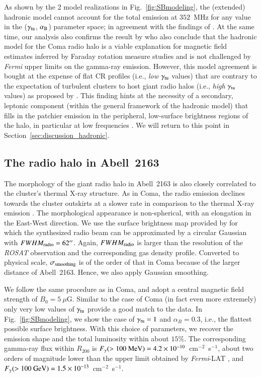 \documentclass[useAMS,usenatbib]{mn2e}
\begin{document}
As shown by the 2 model realizations in Fig.~\ref{fig:SBmodeling}, the
(extended) hadronic model cannot account for the total emission at $352$~MHz for
any value in the ($\gamma_{{\mathrm{tu}}}$, $\alpha_{{\mathrm{B}}}$) parameter space; in
agreement with the findings of \citet{2012arXiv1207.3025B}. At the same time,
our analysis also confirms the result by \citet{2012...VERITAS} who also
conclude that the hadronic model for the Coma radio halo is a viable explanation
for magnetic field estimates inferred by Faraday rotation measure studies
\citep{2010A&A...513A..30B} and is not challenged by {\em Fermi} upper limits on
the gamma-ray emission. However, this model agreement is bought at the expense
of flat CR profiles (i.e., {\em low} $\gamma_{{\mathrm{tu}}}$ values) that are
contrary to the expectation of turbulent clusters to host giant radio halos
(i.e., {\em high} $\gamma_{{\mathrm{tu}}}$ values) as proposed by
\citet{2011A&A...527A..99E}. This finding hints at the necessity of a secondary,
leptonic component (within the general framework of the hadronic model) that
fills in the patchier emission in the peripheral, low-surface brightness regions
of the halo, in particular at low frequencies \cite[see Fig.~3
of][]{2011MNRAS.412....2B}. We will return to this point in
Section~\ref{sec:discussion_hadronic}.


\subsection{The radio halo in Abell~2163}

The morphology of the giant radio halo in Abell~2163 is also closely correlated
to the cluster's thermal X-ray structure. As in Coma, the radio emission declines
towards the cluster outskirts at a slower rate in comparison to the thermal
X-ray emission \citep{2001A&A...373..106F}. The morphological appearance is
non-spherical, with an elongation in the East-West direction. We use the surface
brightness map provided by \citet{2009A&A...499..679M} for which the synthesized
radio beam can be approximated by a circular Gaussian with
$FWHM_{{\mathrm{radio}}}=62\hbox{$^{\prime\prime}$}$.  Again, $FWHM_{{\mathrm{radio}}}$ is larger than the
resolution of the \emph{ROSAT} observation and the corresponding gas density
profile. Converted to physical scale, $\sigma_{{\mathrm{smoothing}}}$ is of the order
of that in Coma because of the larger distance of Abell~2163. Hence, we also apply
Gaussian smoothing.

We follow the same procedure as in Coma, and adopt a central magnetic field
strength of $B_{0}=5~\mu$G. Similar to the case of Coma (in fact even more
extremely) only very low values of $\gamma_{{\mathrm{tu}}}$ provide a good match to
the data.  In Fig.~\ref{fig:SBmodeling}, we show the case of
$\gamma_{{\mathrm{tu}}}=1$ and $\alpha_B=0.3$, i.e., the flattest possible surface
brightness. With this choice of parameters, we recover the emission shape and
the total luminosity within about $15\%$.  The corresponding gamma-ray flux
within $R_{200}$ is $F_{\gamma} (>100~{\mathrm{MeV}}) = 4.2
\times10^{-10}$~cm$^{-2}$~s$^{-1}$, about two orders of magnitude lower than the
upper limit obtained by \emph{Fermi}-LAT \citep{2010ApJ...717L..71A}, and
$F_{\gamma} (>100~{\mathrm{GeV}}) =1.5 \times10^{-13}$~cm$^{-2}$~s$^{-1}$.
\end{document}

